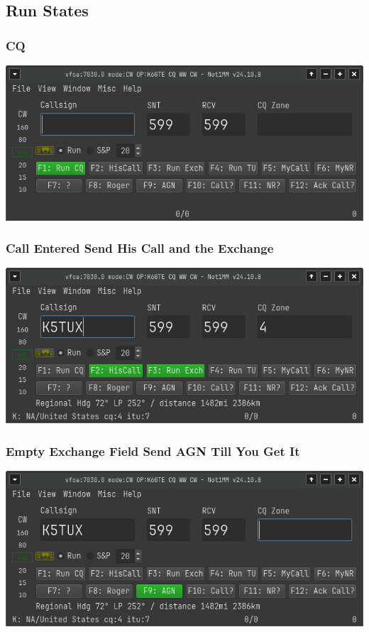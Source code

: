 \documentclass{article}
\begin{document}
\subsection{Run States}

\subsubsection{CQ}

\vspace{0.5cm}
\includegraphics[width=0.75\linewidth]{pic/esm_cq.png}

\subsubsection{Call Entered Send His Call and the Exchange}

\vspace{0.5cm}
\includegraphics[width=0.75\linewidth]{pic/esm_withcall.png}

\subsubsection{Empty Exchange Field Send AGN Till You Get It}

\vspace{0.5cm}
\includegraphics[width=0.75\linewidth]{pic/esm_empty_exchange.png}
\end{document}
